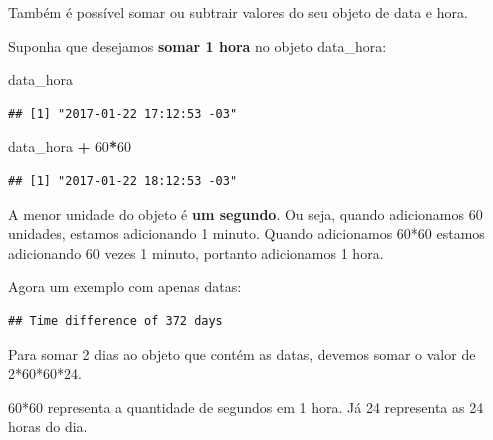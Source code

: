 \documentclass[
]{book}
\newenvironment{Shaded}{\begin{snugshade}}{\end{snugshade}}
\newcommand{\DataTypeTok}[1]{\textcolor[rgb]{0.13,0.29,0.53}{#1}}
\newcommand{\DecValTok}[1]{\textcolor[rgb]{0.00,0.00,0.81}{#1}}
\newcommand{\KeywordTok}[1]{\textcolor[rgb]{0.13,0.29,0.53}{\textbf{#1}}}
\newcommand{\NormalTok}[1]{#1}
\newcommand{\OperatorTok}[1]{\textcolor[rgb]{0.81,0.36,0.00}{\textbf{#1}}}
\newcommand{\StringTok}[1]{\textcolor[rgb]{0.31,0.60,0.02}{#1}}
\begin{document}
Também é possível somar ou subtrair valores do seu objeto de data e
hora.

Suponha que desejamos \textbf{somar 1 hora} no objeto data\_hora:

\begin{Shaded}
\begin{Highlighting}[]
\NormalTok{data_hora}
\end{Highlighting}
\end{Shaded}

\begin{verbatim}
## [1] "2017-01-22 17:12:53 -03"
\end{verbatim}

\begin{Shaded}
\begin{Highlighting}[]
\NormalTok{data_hora }\OperatorTok{+}\StringTok{ }\DecValTok{60}\OperatorTok{*}\DecValTok{60}
\end{Highlighting}
\end{Shaded}

\begin{verbatim}
## [1] "2017-01-22 18:12:53 -03"
\end{verbatim}

A menor unidade do objeto é \textbf{um segundo}. Ou seja, quando
adicionamos 60 unidades, estamos adicionando 1 minuto. Quando
adicionamos 60*60 estamos adicionando 60 vezes 1 minuto, portanto
adicionamos 1 hora.

Agora um exemplo com apenas datas:

\begin{Shaded}
\end{Shaded}

\begin{verbatim}
## Time difference of 372 days
\end{verbatim}

Para somar 2 dias ao objeto que contém as datas, devemos somar o valor
de 2*60*60*24.

60*60 representa a quantidade de segundos em 1 hora. Já 24 representa as
24 horas do dia.
\end{document}
